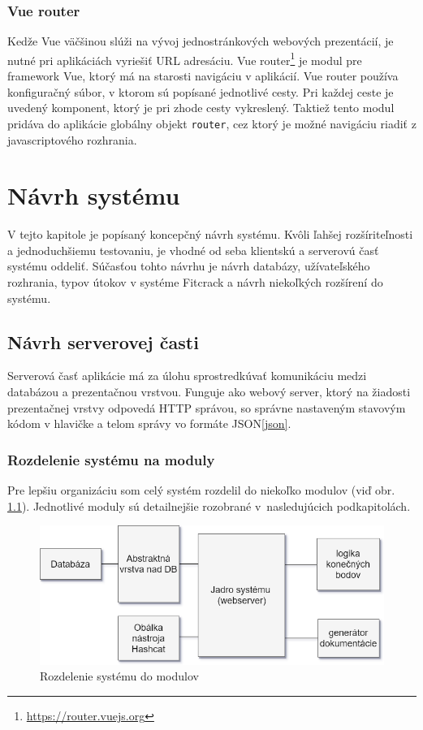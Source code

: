 \documentclass[slovak]{fitthesis}
\begin{document}
\subsection{Vue router}\label{vueRouter}
Kedže Vue väčšinou slúži na vývoj jednostránkových webových prezentácií, je nutné pri aplikáciách vyriešiť URL adresáciu. Vue router\footnote{\url{https://router.vuejs.org}} je modul pre framework Vue, ktorý má na starosti navigáciu v aplikácií. Vue router používa konfiguračný súbor, v ktorom sú popísané jednotlivé cesty. Pri každej ceste je uvedený komponent, ktorý je pri zhode cesty vykreslený. Taktiež tento modul pridáva do aplikácie globálny objekt \texttt{router}, cez ktorý je možné navigáciu riadiť z javascriptového rozhrania.


\chapter{Návrh systému}\label{navrh}
V tejto kapitole je popísaný koncepčný návrh systému. Kvôli ľahšej rozšíriteľnosti a jednoduchšiemu testovaniu, je vhodné od seba klientskú a serverovú časť systému oddeliť. Súčasťou tohto návrhu je  návrh databázy, užívateľského rozhrania, typov útokov v systéme Fitcrack a návrh niekoľkých rozšírení do systému. 

\section{Návrh serverovej časti}\label{navrhServer}
Serverová časť aplikácie má za úlohu sprostredkúvať komunikáciu medzi databázou a prezentačnou vrstvou. Funguje ako webový server, ktorý na žiadosti prezentačnej vrstvy odpovedá HTTP správou, so správne nastaveným stavovým kódom v hlavičke a telom správy vo formáte JSON\ref{json}.

\subsection{Rozdelenie systému na moduly}
Pre lepšiu organizáciu som celý systém rozdelil do niekoľko modulov (viď obr. \ref{fig:moduly}). Jednotlivé moduly sú detailnejšie rozobrané v~nasledujúcich podkapitolách. 

\begin{figure}[h]
    \centering
    \includegraphics[scale=0.6]{obrazky/moduly.png}
    \caption{Rozdelenie systému do modulov}
    \label{fig:moduly}
\end{figure}
\end{document}
